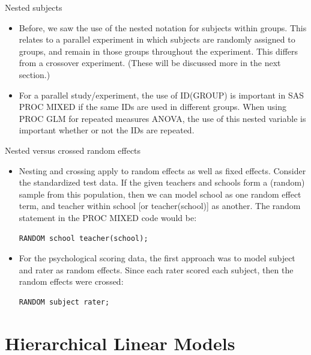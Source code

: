 \documentclass[
  9pt,
  ignorenonframetext,
]{beamer}
\begin{document}
\begin{frame}{Nested subjects}
\protect\hypertarget{nested-subjects}{}
\begin{itemize}
\item
  Before, we saw the use of the nested notation for subjects within
  groups. This relates to a parallel experiment in which subjects are
  randomly assigned to groups, and remain in those groups throughout the
  experiment. This differs from a crossover experiment. (These will be
  discussed more in the next section.)
\item
  For a parallel study/experiment, the use of ID(GROUP) is important in
  SAS PROC MIXED if the same IDs are used in different groups. When
  using PROC GLM for repeated measures ANOVA, the use of this nested
  variable is important whether or not the IDs are repeated.
\end{itemize}
\end{frame}

\begin{frame}[fragile]{Nested versus crossed random effects}
\protect\hypertarget{nested-versus-crossed-random-effects}{}
\begin{itemize}
\item
  Nesting and crossing apply to random effects as well as fixed effects.
  Consider the standardized test data. If the given teachers and schools
  form a (random) sample from this population, then we can model school
  as one random effect term, and teacher within school {[}or
  teacher(school){]} as another. The random statement in the PROC MIXED
  code would be:

\begin{verbatim}
RANDOM school teacher(school);
\end{verbatim}
\item
  For the psychological scoring data, the first approach was to model
  subject and rater as random effects. Since each rater scored each
  subject, then the random effects were crossed:

\begin{verbatim}
RANDOM subject rater;
\end{verbatim}
\end{itemize}
\end{frame}

\hypertarget{hierarchical-linear-models}{%
\section{Hierarchical Linear Models}\label{hierarchical-linear-models}}
\end{document}
